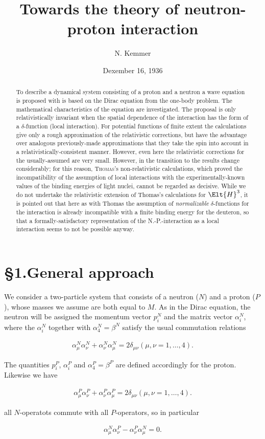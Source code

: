 \documentclass{article}
\title{Towards the theory of neutron-proton interaction}
\author{N. Kemmer}
\date{Dexember 16, 1936}
\newcommand{\uequ}[1]{
\begin{align*}
#1
\end{align*}
}
\begin{document}
\maketitle

\begin{abstract}
To describe a dynamical system consisting of a proton and a neutron a wave equation is proposed with is based on the Dirac equation from the one-body problem. The mathematical characteristics of the equation are investigated. The proposal is only relativistically invariant when the spatial dependence of the interaction has the form of a $\delta$-function (local interaction). For potential functions of finite extent the calculations give only a rough approximation of the relativistic corrections, but have the advantage over analogous previously-made\cite{1} approximations that they take the spin into account in a relativistically-consistent manner. However, even here the relativistic corrections for the usually-assumed  are very small. However, in the transition to \textit{} the results change considerably; for this reason, \textsc{Thomas}'s\cite{2} non-relativistic calculations, which proved the incompatibility of the assumption of local interactions with the experimentally-known values of the binding energies of light nuclei, cannot be regarded as decisive. While we do not undertake the relativistic extension of Thomas's calculations for $\Elt{H}^3$, it is pointed out that here as with Thomas the assumption of \textit{normalizable} $\delta$-functions for the interaction is already incompatible with a finite binding energy for the deuteron, so that a formally-satisfactory representation of the N.-P.-interaction as a local interaction seems to not be possible anyway.
\end{abstract}

\section*{§1.General approach}

We consider a two-particle system that consists of a neutron ($N$) and a proton ($P$), whose masses we assume are both equal to $M$. As in the Dirac equation, the neutron will be assigned the momentum vector $p^N_i$ and the matrix vector $\alpha^N_i$, where the $\alpha^N_i$ together with $\alpha^N_4 = \beta^N$ satisfy the usual commutation relations
\uequ{
\alpha^N_\mu \alpha^N_\nu + \alpha^N_\nu \alpha^N_\mu = 2\delta_{\mu\nu} (\mu, \nu = 1,\dots, 4).
}
The quantities $p^P_i$, $\alpha^P_i$ and $\alpha^P_4 = \beta^P$ are defined accordingly for the proton. Likewise we have
\uequ{
\alpha^P_\mu \alpha^P_\nu + \alpha^P_\nu \alpha^P_\mu = 2\delta_{\mu\nu} (\mu, \nu = 1,\dots, 4).
}
all $N$-operatots commute with all $P$-operators, so in particular
\uequ{
\alpha^N_\mu \alpha^P_\nu - \alpha^P_\nu \alpha^N_\mu = 0.
}
\end{document}
